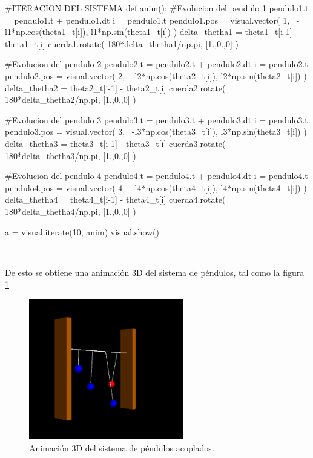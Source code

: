 \begin{listing}[style=python]
#ITERACION DEL SISTEMA
def anim(): 
    #Evolucion del pendulo 1
    pendulo1.t = pendulo1.t + pendulo1.dt
    i = pendulo1.t
    pendulo1.pos = visual.vector( 1, \
    -l1*np.cos(theta1_t[i]), l1*np.sin(theta1_t[i]) )
    delta_thetha1 = theta1_t[i-1] - theta1_t[i]
    cuerda1.rotate( 180*delta_thetha1/np.pi, [1.,0.,0] )
    
    #Evolucion del pendulo 2
    pendulo2.t = pendulo2.t + pendulo2.dt
    i = pendulo2.t
    pendulo2.pos = visual.vector( 2, \
    -l2*np.cos(theta2_t[i]), l2*np.sin(theta2_t[i]) )
    delta_thetha2 = theta2_t[i-1] - theta2_t[i]
    cuerda2.rotate( 180*delta_thetha2/np.pi, [1.,0.,0] )
    
    #Evolucion del pendulo 3
    pendulo3.t = pendulo3.t + pendulo3.dt
    i = pendulo3.t
    pendulo3.pos = visual.vector( 3, \
    -l3*np.cos(theta3_t[i]), l3*np.sin(theta3_t[i]) )
    delta_thetha3 = theta3_t[i-1] - theta3_t[i]
    cuerda3.rotate( 180*delta_thetha3/np.pi, [1.,0.,0] )
    
    #Evolucion del pendulo 4
    pendulo4.t = pendulo4.t + pendulo4.dt
    i = pendulo4.t
    pendulo4.pos = visual.vector( 4, \
    -l4*np.cos(theta4_t[i]), l4*np.sin(theta4_t[i]) )
    delta_thetha4 = theta4_t[i-1] - theta4_t[i]
    cuerda4.rotate( 180*delta_thetha4/np.pi, [1.,0.,0] )
    
a = visual.iterate(10, anim)
visual.show()
\end{listing}
	
\

De esto se obtiene una animación 3D del sistema de péndulos, tal como la 
figura \ref{fig:acopled_pendulum_3D}

\newpage
\begin{figure}[htbp]
	\centering
	\includegraphics[width=0.60\textwidth]
	{./pictures/acopled_pendulum_3D.png}

	\caption{\small{Animación 3D del sistema de péndulos acoplados.}}
	
	\label{fig:acopled_pendulum_3D}
\end{figure}


